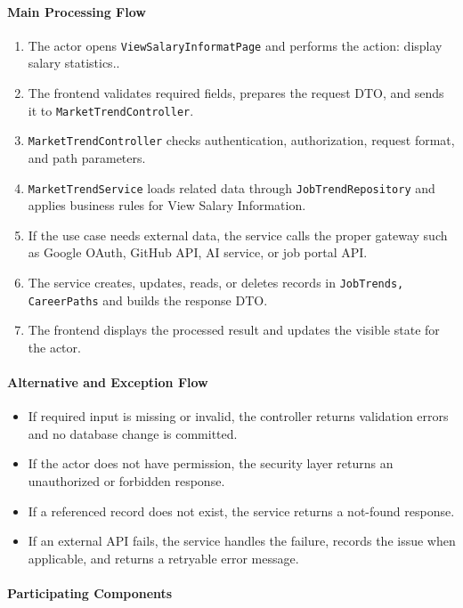 \paragraph{Main Processing Flow}

\begin{enumerate}
    \item The actor opens \texttt{ViewSalaryInformatPage} and performs the action: display salary statistics..
    \item The frontend validates required fields, prepares the request DTO, and sends it to \texttt{MarketTrendController}.
    \item \texttt{MarketTrendController} checks authentication, authorization, request format, and path parameters.
    \item \texttt{MarketTrendService} loads related data through \texttt{JobTrendRepository} and applies business rules for View Salary Information.
    \item If the use case needs external data, the service calls the proper gateway such as Google OAuth, GitHub API, AI service, or job portal API.
    \item The service creates, updates, reads, or deletes records in \texttt{JobTrends, CareerPaths} and builds the response DTO.
    \item The frontend displays the processed result and updates the visible state for the actor.
\end{enumerate}

\paragraph{Alternative and Exception Flow}

\begin{itemize}
    \item If required input is missing or invalid, the controller returns validation errors and no database change is committed.
    \item If the actor does not have permission, the security layer returns an unauthorized or forbidden response.
    \item If a referenced record does not exist, the service returns a not-found response.
    \item If an external API fails, the service handles the failure, records the issue when applicable, and returns a retryable error message.
\end{itemize}

\paragraph{Participating Components}

